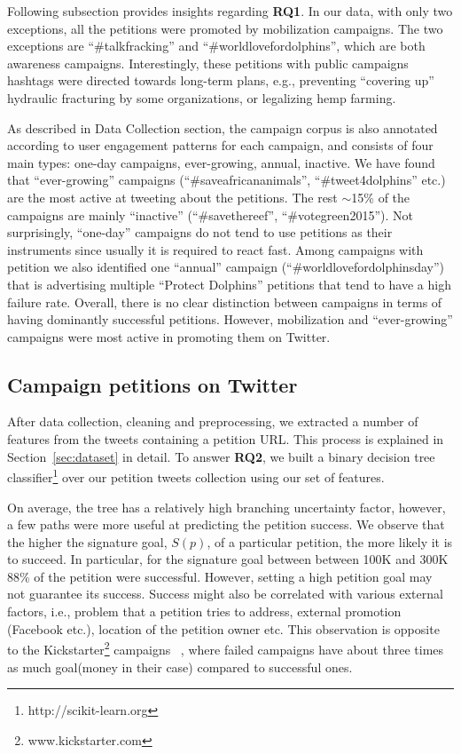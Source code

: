 Following subsection provides insights regarding \textbf{RQ1}.
In our data, with only two exceptions, all the petitions were promoted by mobilization campaigns. The two exceptions are ``\#talkfracking'' and ``\#worldlovefordolphins'', which are both awareness campaigns.
Interestingly, these petitions with public campaigns hashtags were directed towards long-term plans, e.g., preventing ``covering up'' hydraulic fracturing by some organizations, or legalizing hemp farming.

As described in Data Collection section, the campaign corpus is also annotated according to user engagement patterns for each campaign, and consists of four main types: one-day campaigns, ever-growing, annual, inactive.
We have found that ``ever-growing'' campaigns (``\#saveafricananimals'', ``\#tweet4dolphins'' etc.) are the most active at tweeting about the petitions.
The rest $\sim$15\% of the campaigns are mainly ``inactive'' (``\#savethereef'', ``\#votegreen2015'').
Not surprisingly, ``one-day'' campaigns do not tend to use petitions as their instruments since usually it is required to react fast.
Among campaigns with petition we also identified one ``annual'' campaign (``\#worldlovefordolphinsday'') that is advertising multiple ``Protect Dolphins'' petitions that tend to have a high failure rate.
Overall, there is no clear distinction between campaigns in terms of having dominantly successful petitions.
However, mobilization and ``ever-growing'' campaigns were most active in promoting them on Twitter.

\subsection{Campaign petitions on Twitter}
After data collection, cleaning and preprocessing, we extracted a number of features from the tweets containing a petition URL.
This process is explained in Section~\ref{sec:dataset} in detail.
To answer \textbf{RQ2}, we built a binary decision tree classifier\footnote{ http://scikit-learn.org } over our petition tweets collection using our set of features.

On average, the tree has a relatively high branching uncertainty factor, however, a few paths were more useful at predicting the petition success.
We observe that the higher the signature goal, $S(p)$, of a particular petition, the more likely it is to succeed.
In particular, for the signature goal between between 100K and 300K 88\% of the petition were successful.
However, setting a high petition goal may not guarantee its success. Success might also be correlated with various external factors, i.e., problem that a petition tries to address, external promotion (Facebook etc.), location of the petition owner etc.
This observation is opposite to the Kickstarter\footnote{www.kickstarter.com} campaigns~\citeauthor{Etter2013} , where failed campaigns have about three times as much goal(money in their case) compared to successful ones.

